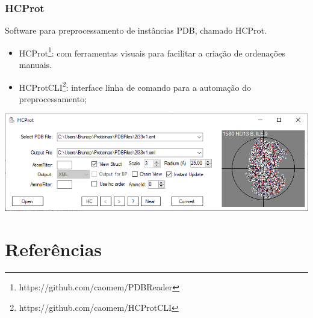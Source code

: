 \documentclass[10pt]{beamer}
\theoremstyle{plain}
\theoremstyle{definition}
\begin{document}
	\begin{frame}
		\frametitle{\normalsize HCProt} 
		{
			\small
			
			Software para preprocessamento de instâncias PDB, chamado HCProt. 
			\begin{itemize}
				\item HCProt\footnote{https://github.com/caomem/PDBReader}: com ferramentas visuais para facilitar a criação de ordenações manuais.
				\item HCProtCLI\footnote{https://github.com/caomem/HCProtCLI}: interface linha de comando para a automação do preprocessamento;
			\end{itemize}
			
			\begin{center}
				\includegraphics[width=0.8\linewidth]{molproj.png}	
			\end{center}
		}	
	\end{frame}
	
	\section{Referências}
	\begin{frame}		
		
		{\footnotesize
		
		}
	\end{frame}
	
\end{document}
